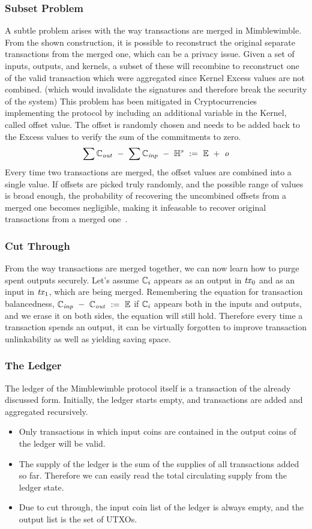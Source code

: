 \subsubsection{Subset Problem}
A subtle problem arises with the way transactions are merged in Mimblewimble. From the shown construction, it is possible to reconstruct the original separate transactions from the merged one,
which can be a privacy issue. Given a set of inputs, outputs, and kernels, a subset of these will recombine to reconstruct one of the valid transaction which were aggregated since Kernel Excess values are not combined.
(which would invalidate the signatures and therefore break the security of the system) This problem has been mitigated in Cryptocurrencies implementing the protocol by including an
additional variable in the Kernel, called offset value. The offset is randomly chosen and needs to be added back to the Excess values to verify the sum of the commitments to zero.
\[ \sum{\mathbb{C}_{\mathit{out}}} ~-~ \sum\mathbb{C}_{\mathit{inp}} ~-~ \mathbb{H}^{\mathit{s}} ~:=~ \mathbb{E} ~+~ \mathit{o}\]
Every time two transactions are merged, the offset values are combined into a single value. If offsets are picked truly randomly, and the possible range of values is broad enough, the probability of recovering the
uncombined offsets from a merged one becomes negligible, making it infeasable to recover original transactions from a merged one~\cite{poelstra2016mimblewimble}.

\subsubsection{Cut Through}
From the way transactions are merged together, we can now learn how to purge spent outputs securely. Let's assume $\mathbb{C}_i$ appears as an output in $\mathit{tx}_0$ and as an input in $\mathit{tx}_1$,
which are being merged. Remembering the equation for transaction balancedness, $\mathbb{C}_{\mathit{inp}} ~-~ \mathbb{C}_{\mathit{out}} ~:=~ \mathbb{E}$ if $\mathbb{C}_i$ appears both in the inputs and outputs, and we erase it on both sides, the equation will still hold.
Therefore every time a transaction spends an output, it can be virtually forgotten to improve transaction unlinkability as well as yielding saving space.

\subsubsection{The Ledger}
The ledger of the Mimblewimble protocol itself is a transaction of the already discussed form. Initially, the ledger starts empty, and transactions are added and aggregated recursively.
\begin{itemize}
    \item Only transactions in which input coins are contained in the output coins of the ledger will be valid.
    \item The supply of the ledger is the sum of the supplies of all transactions added so far. Therefore we can easily read the total circulating supply from the ledger state.
    \item Due to cut through, the input coin list of the ledger is always empty, and the output list is the set of UTXOs.
\end{itemize}

